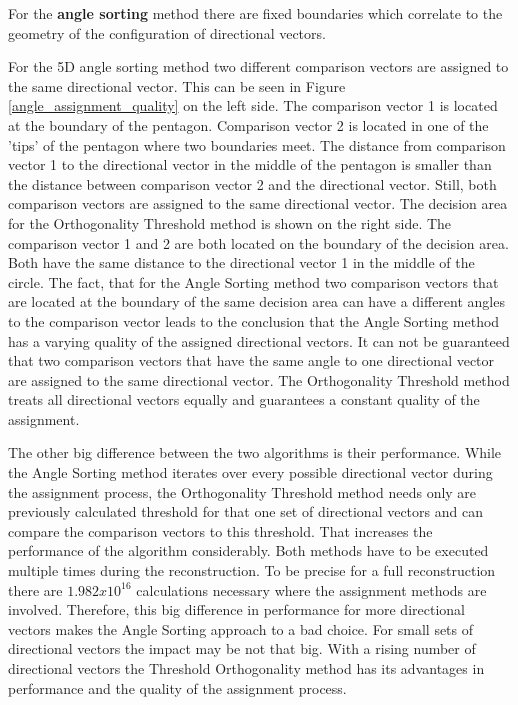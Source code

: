For the \textbf{angle sorting} method there are fixed boundaries which correlate to the geometry of the configuration of directional vectors. 


For the 5D angle sorting method two different comparison vectors are assigned to the same directional vector. This can be seen in Figure \ref{angle_assignment_quality} on the left side. The comparison vector 1 is located at the boundary of the pentagon. Comparison vector 2 is located in one of the 'tips' of the pentagon where two boundaries meet. The distance from comparison vector 1 to the directional vector in the middle of the pentagon is smaller than the distance between comparison vector 2 and the directional vector. Still, both comparison vectors are assigned to the same directional vector. 
The decision area for the Orthogonality Threshold method is shown on the right side. The comparison vector 1 and 2 are both located on the boundary of the decision area. Both have the same distance to the directional vector 1 in the middle of the circle. The fact, that for the Angle Sorting method two comparison vectors that are located at the boundary of the same decision area can have a different angles to the comparison vector leads to the conclusion that the Angle Sorting method has a varying quality of the assigned directional vectors. It can not be guaranteed that two comparison vectors that have the same angle to one directional vector are assigned to the same directional vector. The Orthogonality Threshold method treats all directional vectors equally and guarantees a constant quality of the assignment.

\bigskip

The other big difference between the two algorithms is their performance. While the Angle Sorting method iterates over every possible directional vector during the assignment process, the Orthogonality Threshold method needs only are previously calculated threshold for that one set of directional vectors and can compare the comparison vectors to this threshold. That increases the performance of the algorithm considerably. Both methods have to be executed multiple times during the reconstruction. To be precise for a full reconstruction there are $1.982x10^{16}$ calculations necessary where the assignment methods are involved. Therefore, this big difference in performance for more directional vectors makes the Angle Sorting approach to a bad choice. For small sets of directional vectors the impact may be not that big. With a rising number of directional vectors the Threshold Orthogonality method has its advantages in performance and the quality of the assignment process.  





